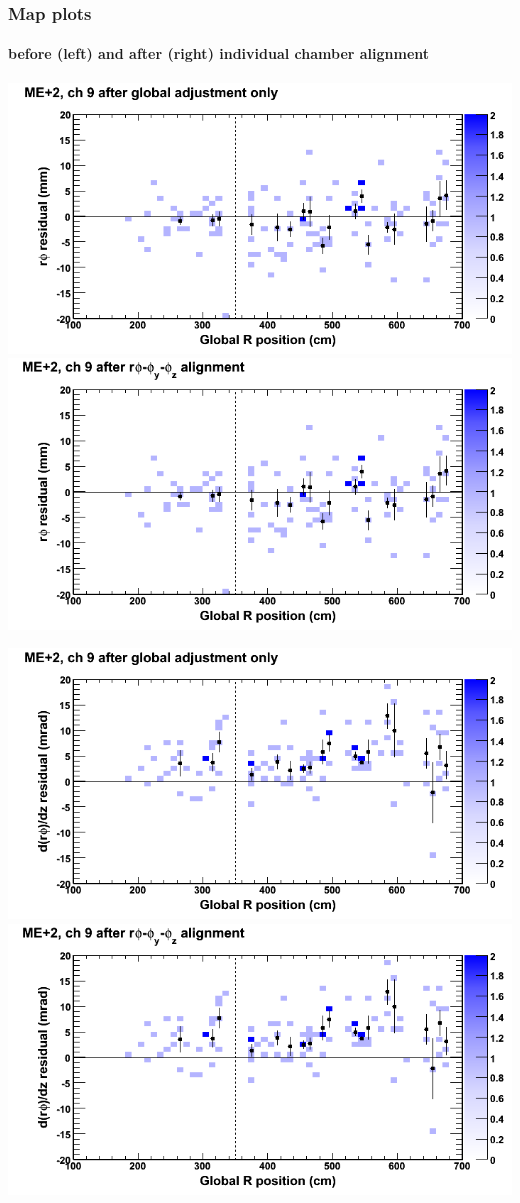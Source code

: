 \documentclass[compress]{beamer}
\begin{document}
\begin{frame}
\frametitle{Map plots}
\framesubtitle{before (left) and after (right) individual chamber alignment}
\includegraphics[width=0.5\linewidth]{ringmapplots_3dof/before_CSCvsr_mep2ch09_x.png} \includegraphics[width=0.5\linewidth]{ringmapplots_3dof/after_CSCvsr_mep2ch09_x.png}

\includegraphics[width=0.5\linewidth]{ringmapplots_3dof/before_CSCvsr_mep2ch09_dxdz.png} \includegraphics[width=0.5\linewidth]{ringmapplots_3dof/after_CSCvsr_mep2ch09_dxdz.png}
\end{frame}
\end{document}
